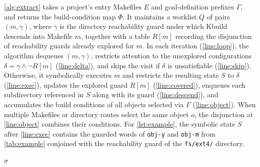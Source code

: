 \documentclass[acmsmall,screen,review,anonymous,nonacm]{acmart}
\begin{document}
    \autoref{alg:extract} takes a project's entry Makefiles $E$ and goal-definition prefixes $\Gamma$, and returns the build-condition map $\Phi$.
    It maintains a worklist $Q$ of pairs $(m, \gamma)$, where $\gamma$ is the directory reachability guard under which Kbuild descends into Makefile $m$, together with a table $R[m]$ recording the disjunction of reachability guards already explored for $m$.
    In each iteration (\autoref{line:loop}), the algorithm dequeues $(m, \gamma)$, restricts attention to the unexplored configurations $\delta = \gamma \land \neg R[m]$ (\autoref{line:delta}), and skips the visit if $\delta$ is unsatisfiable (\autoref{line:skip}).
    Otherwise, it symbolically executes $m$ and restricts the resulting state $S$ to $\delta$ (\autoref{line:exec}), updates the explored guard $R[m]$ (\autoref{line:covered}), enqueues each subdirectory referenced in $S$ along with its guard (\autoref{line:descend}), and accumulates the build conditions of all objects selected via $\Gamma$ (\autoref{line:object}).
    When multiple Makefiles or directory routes select the same object $o$, the disjunction at \autoref{line:object} combines their conditions.
    For \autoref{lst:example}, the symbolic state $S$ after \autoref{line:exec} contains the guarded words of \texttt{obj-y} and \texttt{obj-m} from \autoref{tab:example} conjoined with the reachability guard of the \texttt{fs/ext4/} directory.


    \begin{algorithm}[t]
    \caption{\textsc{Exec}: symbolic execution of one statement}\label{alg:exec}
    \Return $\sigma$\;
    \end{algorithm}
\end{document}
